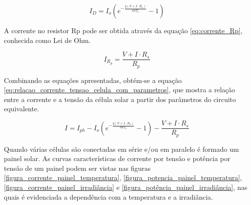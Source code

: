 \begin{equation} \label{eq:corrente_diodo}
I_{D} = I_{o}(e^{-\frac{q(V+I\cdot R_{s})}{nkT_{c}}}-1)
\end{equation}

A corrente no resistor \gls{Rp} pode ser obtida através da equação \ref{eq:corrente_Rp}, conhecida como Lei de Ohm.

\begin{equation} \label{eq:corrente_Rp}
I_{R_{p}} = \frac{V+I\cdot R_{s}}{R_{p}}
\end{equation}

Combinando as equações apresentadas, obtém-se a equação \ref{eq:relacao_corrente_tensao_celula_com_parametros}, que mostra a relação entre a corrente e a tensão da célula solar a partir dos parâmetros do circuito equivalente.

\begin{equation} \label{eq:relacao_corrente_tensao_celula_com_parametros}
I = I_{ph} - I_{o}(e^{-\frac{q(V+I\cdot R_{s})}{nkT_{c}}}-1) - \frac{V+I\cdot R_{s}}{R_{p}}
\end{equation}

Quando várias células são conectadas em série e/ou em paralelo é formado um painel solar. As curvas características de corrente por tensão e potência por tensão de um painel podem ser vistas nas figuras \ref{figura_corrente_painel_temperatura}, \ref{figura_potencia_painel_temperatura}, \ref{figura_corrente_painel_irradiância} e \ref{figura_potência_painel_irradiância}, nas quais é evidenciada a dependência com a temperatura e a irradiância. 

\solarPanelCharacteristicsMinusTwentyFive
{}\solarPanelCharacteristicsZero
{}\solarPanelCharacteristicsTwentyFive
{}\solarPanelCharacteristicsFifty


